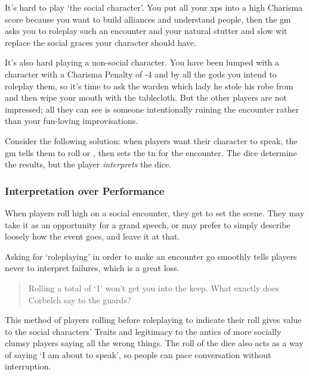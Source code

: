 \begin{multicols}{2}

\noindent
It's hard to play `the social character'.
You put all your \glspl{xp} into a high Charisma score because you want to build alliances and understand people, then the \gls{gm} asks you to roleplay such an encounter and your natural stutter and slow wit replace the social graces your character should have.

It's also hard playing a non-social character.
You have been lumped with a character with a Charisma Penalty of -4 and by all the gods you intend to roleplay them, so it's time to ask the \gls{warden} which lady he stole his robe from and then wipe your mouth with the tablecloth.
But the other players are not impressed; all they can see is someone intentionally ruining the encounter rather than your fun-loving improvisations.

Consider the following solution: when players want their character to speak, the \gls{gm} tells them to roll  or , then sets the \gls{tn} for the encounter.
The dice determine the results, but the player \emph{interprets} the dice.

\subsubsection{Interpretation over Performance}

When players roll high on a social encounter, they get to set the scene.
They may take it as an opportunity for a grand speech, or may prefer to simply describe loosely how the event goes, and leave it at that.

Asking for `roleplaying' in order to make an encounter go smoothly tells players never to interpret failures, which is a great loss.

\begin{quotation}
  Rolling a total of `1' won't get you into the keep.
  What exactly does Corbelch say to the guards?
\end{quotation}

This method of players rolling before roleplaying to indicate their roll gives value to the social characters' Traits and legitimacy to the antics of more socially clumsy players saying all the wrong things.
The roll of the dice also acts as a way of saying `I am about to speak', so people can pace conversation without interruption.

\end{multicols}

